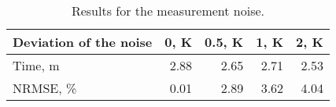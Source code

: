\begin{table}[h]
  \centering
  \caption{Results for the measurement noise.}
  \begin{tabular*}{0.80\linewidth}{lrrrr}
    \toprule
    Deviation of the noise & 0, K & 0.5, K & 1, K & 2, K \\
    \midrule
    Time, m   & 2.88 & 2.65 & 2.71 & 2.53 \\
    NRMSE, \% & 0.01 & 2.89 & 3.62 & 4.04 \\
    \bottomrule
  \end{tabular*}
  \vspace{-1em}
\end{table}

